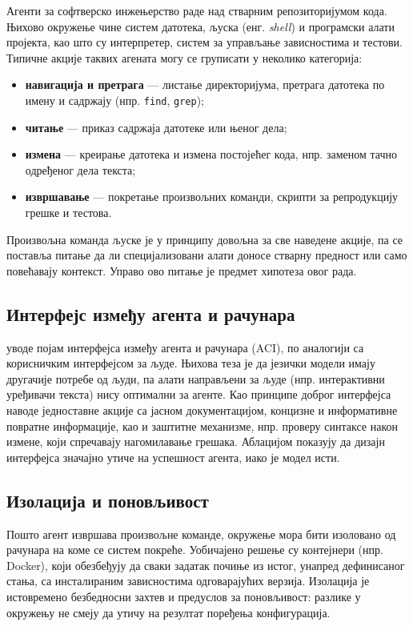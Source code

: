 \documentclass[12pt,a4paper]{report}
\begin{document}
	Агенти за софтверско инжењерство раде над стварним репозиторијумом кода.
	Њихово окружење чине систем датотека, љуска (енг. \textit{shell}) и
	програмски алати пројекта, као што су интерпретер, систем за управљање
	зависностима и тестови. Типичне акције таквих агената могу се груписати у
	неколико категорија:
	\begin{itemize}
		\item \textbf{навигација и претрага} — листање директоријума, претрага
		датотека по имену и садржају (нпр. \texttt{find}, \texttt{grep});
		\item \textbf{читање} — приказ садржаја датотеке или њеног дела;
		\item \textbf{измена} — креирање датотека и измена постојећег кода, нпр.
		заменом тачно одређеног дела текста;
		\item \textbf{извршавање} — покретање произвољних команди, скрипти за
		репродукцију грешке и тестова.
	\end{itemize}
	Произвољна команда љуске је у принципу довољна за све наведене акције,
	па се поставља питање да ли специјализовани алати доносе стварну предност
	или само повећавају контекст. Управо ово питање је предмет хипотеза овог
	рада.

	\subsection{Интерфејс између агента и рачунара}

	\textcite{yang2024sweagent} уводе појам интерфејса између агента и
	рачунара (ACI), по аналогији са корисничким интерфејсом за људе. Њихова
	теза је да језички модели имају другачије потребе од људи, па алати
	направљени за људе (нпр. интерактивни уређивачи текста) нису оптимални за
	агенте. Као принципе доброг интерфејса наводе једноставне акције са јасном
	документацијом, концизне и информативне повратне информације, као и
	заштитне механизме, нпр. проверу синтаксе након измене, који спречавају
	нагомилавање грешака. Аблацијом показују да дизајн интерфејса значајно
	утиче на успешност агента, иако је модел исти.

	\subsection{Изолација и поновљивост}

	Пошто агент извршава произвољне команде, окружење мора бити изоловано од
	рачунара на коме се систем покреће. Уобичајено решење су контејнери (нпр.
	Docker), који обезбеђују да сваки задатак почиње из истог, унапред
	дефинисаног стања, са инсталираним зависностима одговарајућих верзија.
	Изолација је истовремено безбедносни захтев и предуслов за поновљивост:
	разлике у окружењу не смеју да утичу на резултат поређења конфигурација.
\end{document}
